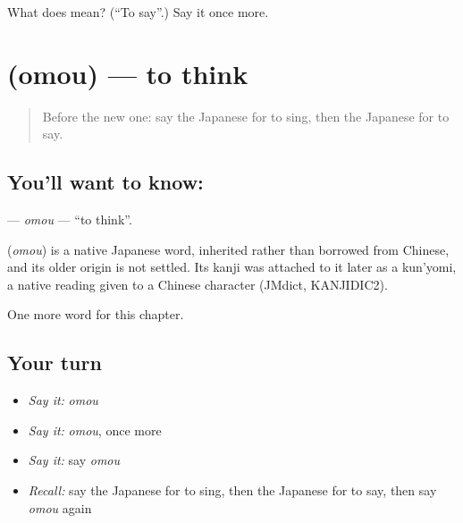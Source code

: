\begin{tcolorbox}[breakable,colback=teal!4,colframe=teal!35!black,title={Before you move on}]
What does  mean? (\textquotedblleft{}To say\textquotedblright{}.) Say it once more.
\end{tcolorbox}
\section[\texorpdfstring{\ja{おもう} (omou)}{おもう (omou)}]{ (omou) — to think}

\label{lesson:JA-C28-omou}



\begin{quote}
Before the new one: say the Japanese for to sing, then the Japanese for to say.
\end{quote}

\subsection*{You'll want to know: }
\textbf{} — \emph{omou} — \textquotedblleft{}to think\textquotedblright{}.

\begin{cousinweb}
\textbf{} (\emph{omou}) is a native Japanese word, inherited rather than borrowed from Chinese, and its older origin is not settled. Its kanji was attached to it later as a kun'yomi, a native reading given to a Chinese character (JMdict, KANJIDIC2).
\end{cousinweb}

\begin{grammarlens}[title={What you've built}]
One more word for this chapter.
\end{grammarlens}

\subsection*{Your turn}
\begin{itemize}
\raggedright
  \item \emph{Say it:} \emph{omou}
  \item \emph{Say it:} \emph{omou}, once more
  \item \emph{Say it:} say \emph{omou}
  \item \emph{Recall:} say the Japanese for to sing, then the Japanese for to say, then say \emph{omou} again
\end{itemize}

